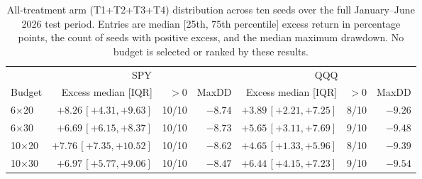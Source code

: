 \begin{table}[t]
\caption{All-treatment arm (T1+T2+T3+T4) distribution across ten seeds over the full January--June 2026 test period. Entries are median [25th, 75th percentile] excess return in percentage points, the count of seeds with positive excess, and the median maximum drawdown. No budget is selected or ranked by these results.}
\label{tab:budget}
\centering
\small
\begin{tabular}{lrrrrrr}
\toprule
& \multicolumn{3}{c}{SPY} & \multicolumn{3}{c}{QQQ} \\
\cmidrule(lr){2-4}\cmidrule(lr){5-7}
Budget & Excess median [IQR] & $>0$ & MaxDD & Excess median [IQR] & $>0$ & MaxDD \\
\midrule
6$\times$20 & $+8.26\,[+4.31,+9.63]$ & 10/10 & $-8.74$ & $+3.89\,[+2.21,+7.25]$ & 8/10 & $-9.26$ \\
6$\times$30 & $+6.69\,[+6.15,+8.37]$ & 10/10 & $-8.73$ & $+5.65\,[+3.11,+7.69]$ & 9/10 & $-9.48$ \\
10$\times$20 & $+7.76\,[+7.35,+10.52]$ & 10/10 & $-8.62$ & $+4.65\,[+1.33,+5.96]$ & 8/10 & $-9.39$ \\
10$\times$30 & $+6.97\,[+5.77,+9.06]$ & 10/10 & $-8.47$ & $+6.44\,[+4.15,+7.23]$ & 9/10 & $-9.54$ \\
\bottomrule
\end{tabular}
\end{table}
